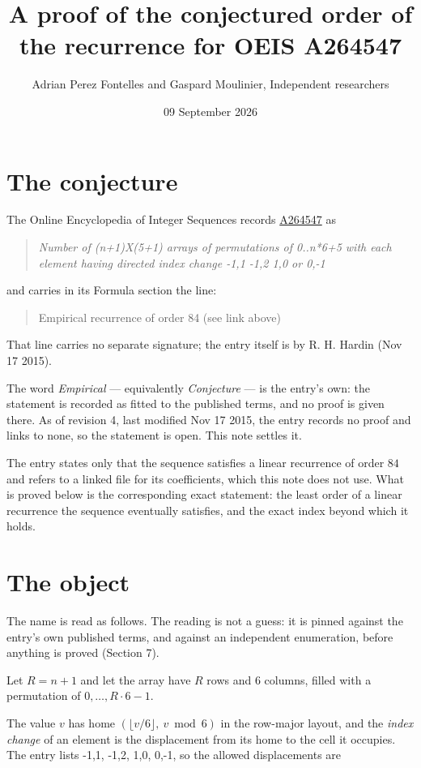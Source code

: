 \documentclass[11pt]{article}
\title{A proof of the conjectured order of the recurrence for OEIS A264547}
\author{Adrian Perez Fontelles and Gaspard Moulinier, Independent researchers}
\date{09 September 2026}
\theoremstyle{definition}
\begin{document}
\maketitle
\section{The conjecture}

The Online Encyclopedia of Integer Sequences records \href{https://oeis.org/A264547}{A264547} as

\begin{quote}\itshape Number of (n+1)X(5+1) arrays of permutations of 0..n*6+5 with each element having directed index change -1,1 -1,2 1,0 or 0,-1\end{quote}

and carries in its Formula section the line:

\begin{quote}\ttfamily Empirical recurrence of order 84 (see link above)\end{quote}

That line carries no separate signature; the entry itself is by R. H. Hardin (Nov 17 2015).

The word {\itshape Empirical} --- equivalently {\itshape Conjecture} --- is the entry's own: the statement is recorded as fitted to the published terms, and no proof is given there. As of revision 4, last modified Nov 17 2015, the entry records no proof and links to none, so the statement is open. This note settles it.

The entry states only that the sequence satisfies a linear recurrence of order $84$ and refers to a linked file for its coefficients, which this note does not use. What is proved below is the corresponding exact statement: the least order of a linear recurrence the sequence eventually satisfies, and the exact index beyond which it holds.

\section{The object}

The name is read as follows. The reading is not a guess: it is pinned against the entry's own published terms, and against an independent enumeration, before anything is proved (Section 7).

Let $R = n + 1$ and let the array have $R$ rows and $6$ columns, filled with a permutation of $0,\dots,R\cdot6-1$.

The value $v$ has home $(\lfloor v/6\rfloor,\ v \bmod 6)$ in the row-major layout, and the {\itshape index change} of an element is the displacement from its home to the cell it occupies. The entry lists -1,1, -1,2, 1,0, 0,-1, so the allowed displacements are
\end{document}
